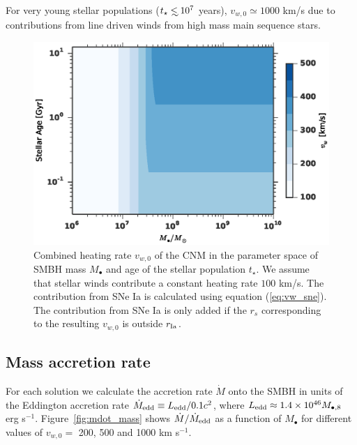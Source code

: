 \documentclass[usenatbib,fleqn]{mn2e}
\newcommand\lsim{\mathrel{\rlap{\lower4pt\hbox{\hskip1pt$\sim$}}
    \raise1pt\hbox{$<$}}}
\newcommand{\Mbh}[1][]{M_{\bullet#1}}
\newcommand{\rIa}{r_{\rm Ia}}
\newcommand{\vwO}{v_{w,0}}
\newcommand{\tage}{t_{\star}}
\begin{document}
  For very young stellar populations ($\tage \lsim 10^7$ years),
  $\vwO\simeq 1000$ km/s due to contributions from line driven winds
  from high mass main sequence stars.

  \begin{figure}
    \includegraphics[width=\columnwidth]{vw-contour.eps}
    \caption{\label{fig:vweff} Combined heating rate $\vwO$ of the CNM in the parameter space of SMBH mass $\Mbh$ and age of the stellar population $t_{\star}$.  We assume that stellar winds contribute a constant heating rate $100$ km/s. The contribution from SNe Ia is calculated using equation (\ref{eq:vw_sne}). The contribution from SNe Ia is only added if the $r_s$ corresponding to the resulting $\vwO$ is outside $\rIa$.}%
  \end{figure}


\subsection{Mass accretion rate}

For each solution we calculate the accretion rate $\dot{M}$ onto the SMBH  in units of the Eddington accretion rate $\dot{M}_{\rm edd} \equiv L_{\rm edd}/0.1 c^{2}$, where $L_{\rm edd} \approx 1.4\times 10^{46}M_{\bullet,8}$ erg s$^{-1}$.  Figure~\ref{fig:mdot_mass} shows $\dot{M}/\dot{M}_{\rm edd}$ as a function of $\Mbh$ for different values of $\vwO =$ 200, 500 and 1000 km s$^{-1}$.   
\end{document}
